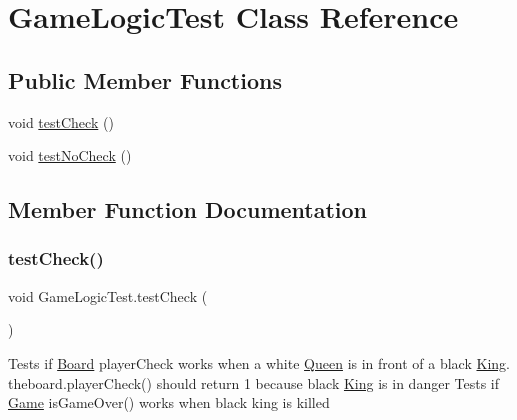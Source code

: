 \hypertarget{class_game_logic_test}{}\section{Game\+Logic\+Test Class Reference}
\label{class_game_logic_test}
\subsection*{Public Member Functions}
\begin{DoxyCompactItemize}
\item 
void \mbox{\hyperlink{class_game_logic_test_a9fed74970a6f8ef183efec6ee5903a71}{test\+Check}} ()
\item 
void \mbox{\hyperlink{class_game_logic_test_acf7307c4ad8204677b94e60dcc860d26}{test\+No\+Check}} ()
\end{DoxyCompactItemize}


\subsection{Member Function Documentation}
\mbox{\label{class_game_logic_test_a9fed74970a6f8ef183efec6ee5903a71}} 
\subsubsection{\texorpdfstring{testCheck()}{testCheck()}}
{\footnotesize\ttfamily void Game\+Logic\+Test.\+test\+Check (\begin{DoxyParamCaption}{ }\end{DoxyParamCaption})\hspace{0.3cm}{\ttfamily [inline]}}

Tests if \mbox{\hyperlink{class_board}{Board}} player\+Check works when a white \mbox{\hyperlink{class_queen}{Queen}} is in front of a black \mbox{\hyperlink{class_king}{King}}. theboard.\+player\+Check() should return 1 because black \mbox{\hyperlink{class_king}{King}} is in danger Tests if \mbox{\hyperlink{class_game}{Game}} is\+Game\+Over() works when black king is killed \mbox{\label{class_game_logic_test_acf7307c4ad8204677b94e60dcc860d26}} 
